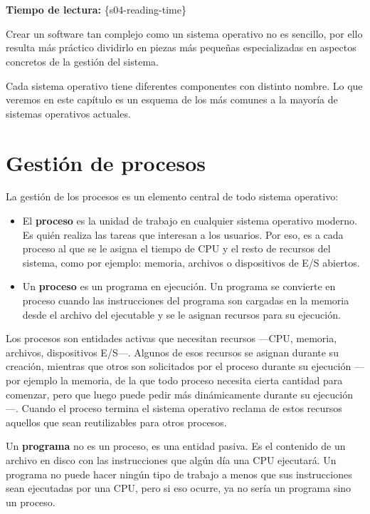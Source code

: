 \section{}

\textbf{Tiempo de lectura:} \{s04-reading-time\}

Crear un software tan complejo como un sistema operativo no es sencillo,
por ello resulta más práctico dividirlo en piezas más pequeñas
especializadas en aspectos concretos de la gestión del sistema.

Cada sistema operativo tiene diferentes componentes con distinto nombre.
Lo que veremos en este capítulo es un esquema de los más comunes a la
mayoría de sistemas operativos actuales.

\section{Gestión de
procesos}\label{sect-componente-gestiuxf3n-de-procesos}

{} La gestión de los procesos es un elemento central de todo sistema
operativo:

\begin{itemize}
\item
  El \textbf{{}proceso} es la unidad de trabajo en cualquier sistema
  operativo moderno. Es quién realiza las tareas que interesan a los
  usuarios. Por eso, es a cada proceso al que se le asigna el tiempo de
  CPU y el resto de recursos del sistema, como por ejemplo: memoria,
  archivos o dispositivos de E/S abiertos.
\item
  Un \textbf{proceso} es un programa en ejecución. Un programa se
  convierte en proceso cuando las instrucciones del programa son
  cargadas en la memoria desde el archivo del ejecutable y se le asignan
  recursos para su ejecución.
\end{itemize}

Los procesos son entidades activas que necesitan recursos ---CPU,
memoria, archivos, dispositivos E/S---. Algunos de esos recursos se
asignan durante su creación, mientras que otros son solicitados por el
proceso durante su ejecución ---por ejemplo la memoria, de la que todo
proceso necesita cierta cantidad para comenzar, pero que luego puede
pedir más dinámicamente durante su ejecución---. Cuando el proceso
termina el sistema operativo reclama de estos recursos aquellos que sean
reutilizables para otros procesos.

Un \textbf{programa} no es un proceso, es una entidad pasiva. Es el
contenido de un archivo en disco con las instrucciones que algún día una
CPU ejecutará. Un programa no puede hacer ningún tipo de trabajo a menos
que sus instrucciones sean ejecutadas por una CPU, pero si eso ocurre,
ya no sería un programa sino un proceso.

